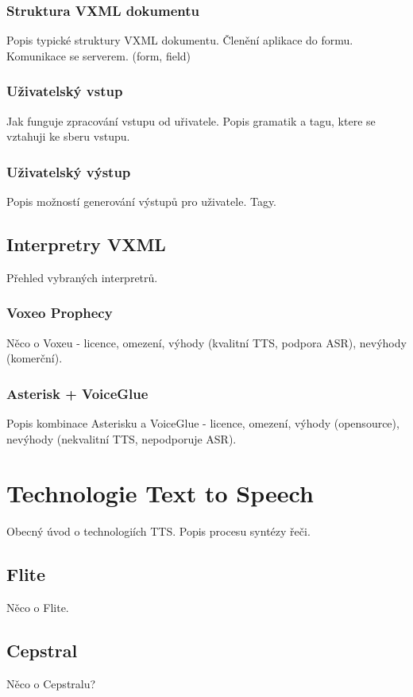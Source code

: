 \documentclass[ing,male,java,dept460]{diploma}						%
\begin{document}
\subsubsection{Struktura VXML dokumentu}
Popis typické struktury VXML dokumentu. Členění aplikace do formu. Komunikace se serverem. (form, field)

\subsubsection{Uživatelský vstup}
Jak funguje zpracování vstupu od uřivatele. Popis gramatik a tagu, ktere se vztahuji ke sberu vstupu.

\subsubsection{Uživatelský výstup}
Popis možností generování výstupů pro uživatele. Tagy.

\subsection{Interpretry VXML}
Přehled vybraných interpretrů.

\subsubsection{Voxeo Prophecy}
Něco o Voxeu - licence, omezení, výhody (kvalitní TTS, podpora ASR), nevýhody (komerční).

\subsubsection{Asterisk + VoiceGlue}
Popis kombinace Asterisku a VoiceGlue - licence, omezení, výhody (opensource), nevýhody (nekvalitní TTS, nepodporuje ASR).

\section{Technologie Text to Speech}
\label{sec:TTS}
Obecný úvod o technologiích TTS. Popis procesu syntézy řeči.

\subsection{Flite}
Něco o Flite.

\subsection{Cepstral}
Něco o Cepstralu?
\end{document}
